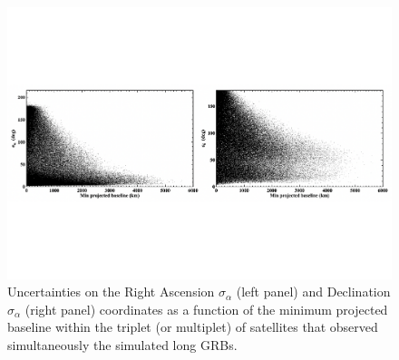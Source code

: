\documentclass[]{spie}  %
\begin{document}
\begin{figure}[h!]
\centering
\includegraphics[scale=0.45,angle=0]{fig_all_pos_long_sim}
\vspace{-2.5cm}
\caption{Uncertainties on the Right Ascension $\sigma_\alpha$ (left panel) and Declination $\sigma_\alpha$ (right panel) coordinates as a function of the minimum projected baseline within the triplet (or multiplet) of satellites that observed simultaneously the simulated long GRBs.} 
\label{fig:all_pos_long_sim}
\end{figure}
\end{document}
